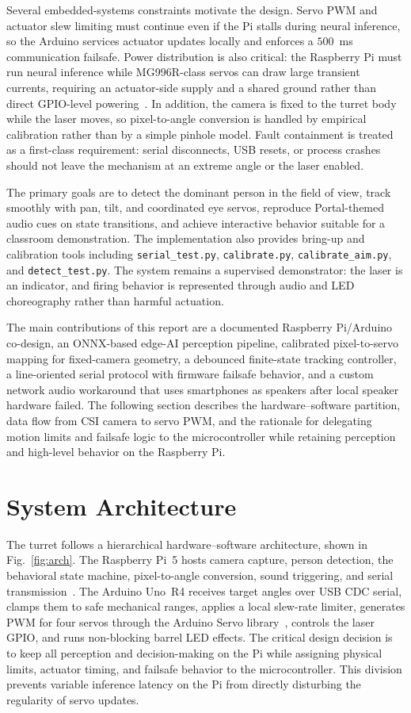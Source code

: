 \documentclass[lettersize,journal]{IEEEtran}
\begin{document}
Several embedded-systems constraints motivate the design. Servo PWM and actuator slew limiting must continue even if the Pi stalls during neural inference, so the Arduino services actuator updates locally and enforces a $500$~ms communication failsafe. Power distribution is also critical: the Raspberry Pi must run neural inference while MG996R-class servos can draw large transient currents, requiring an actuator-side supply and a shared ground rather than direct GPIO-level powering~\cite{arduino_r4}. In addition, the camera is fixed to the turret body while the laser moves, so pixel-to-angle conversion is handled by empirical calibration rather than by a simple pinhole model. Fault containment is treated as a first-class requirement: serial disconnects, USB resets, or process crashes should not leave the mechanism at an extreme angle or the laser enabled.

The primary goals are to detect the dominant person in the field of view, track smoothly with pan, tilt, and coordinated eye servos, reproduce Portal-themed audio cues on state transitions, and achieve interactive behavior suitable for a classroom demonstration. The implementation also provides bring-up and calibration tools including \texttt{serial\_test.py}, \texttt{calibrate.py}, \texttt{calibrate\_aim.py}, and \texttt{detect\_test.py}. The system remains a supervised demonstrator: the laser is an indicator, and firing behavior is represented through audio and LED choreography rather than harmful actuation.

The main contributions of this report are a documented Raspberry Pi/Arduino co-design, an ONNX-based edge-AI perception pipeline, calibrated pixel-to-servo mapping for fixed-camera geometry, a debounced finite-state tracking controller, a line-oriented serial protocol with firmware failsafe behavior, and a custom network audio workaround that uses smartphones as speakers after local speaker hardware failed. The following section describes the hardware--software partition, data flow from CSI camera to servo PWM, and the rationale for delegating motion limits and failsafe logic to the microcontroller while retaining perception and high-level behavior on the Raspberry Pi.

\section{System Architecture}
\label{sec:arch}
The turret follows a hierarchical hardware--software architecture, shown in Fig.~\ref{fig:arch}. The Raspberry Pi~5 hosts camera capture, person detection, the behavioral state machine, pixel-to-angle conversion, sound triggering, and serial transmission~\cite{rpi5}. The Arduino Uno~R4 receives target angles over USB CDC serial, clamps them to safe mechanical ranges, applies a local slew-rate limiter, generates PWM for four servos through the Arduino Servo library~\cite{arduino_servo}, controls the laser GPIO, and runs non-blocking barrel LED effects. The critical design decision is to keep all perception and decision-making on the Pi while assigning physical limits, actuator timing, and failsafe behavior to the microcontroller. This division prevents variable inference latency on the Pi from directly disturbing the regularity of servo updates.
\end{document}
